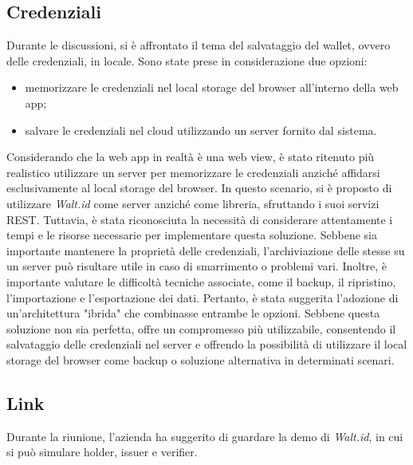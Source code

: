 \subsection{Credenziali}
Durante le discussioni, si è affrontato il tema del salvataggio del wallet, ovvero delle credenziali, in locale. Sono state prese in considerazione due 
opzioni: 
\begin{itemize}
  \item memorizzare le credenziali nel local storage del browser all'interno della web app; 
  \item salvare le credenziali nel cloud utilizzando un server fornito dal sistema. 
\end{itemize} 
Considerando che la web app in realtà è una web view, è stato ritenuto più realistico utilizzare un server per memorizzare le 
credenziali anziché affidarsi esclusivamente al local storage del browser. In questo scenario, si è proposto di utilizzare \textit{Walt.id} 
come server anziché come libreria, sfruttando i suoi servizi REST. Tuttavia, è stata riconosciuta la necessità di considerare attentamente i tempi 
e le risorse necessarie per implementare questa soluzione. Sebbene sia importante mantenere la proprietà delle credenziali, l'archiviazione delle 
stesse su un server può risultare utile in caso di smarrimento o problemi vari. Inoltre, è importante valutare le difficoltà tecniche associate, 
come il backup, il ripristino, l'importazione e l'esportazione dei dati. Pertanto, è stata suggerita l'adozione di un'architettura "ibrida" 
che combinasse entrambe le opzioni. Sebbene questa soluzione non sia perfetta, offre un compromesso più utilizzabile, 
consentendo il salvataggio delle credenziali nel server e offrendo la possibilità di utilizzare il local storage del browser come backup 
o soluzione alternativa in determinati scenari.

\subsection{Link}
Durante la riunione, l'azienda ha suggerito di guardare la demo di \textit{Walt.id}, in cui si può simulare holder, issuer e verifier.
